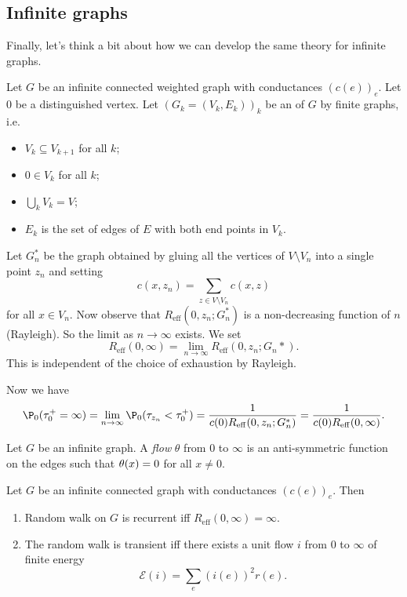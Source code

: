 \documentclass[a4paper]{article}
\let\div\relax
\DeclareMathOperator\div{div}
\begin{document}
\subsection{Infinite graphs}
Finally, let's think a bit about how we can develop the same theory for infinite graphs.

Let $G$ be an infinite connected weighted graph with conductances $(c(e))_e$. Let $0$ be a distinguished vertex. Let $(G_k = (V_k, E_k))_k$ be an  of $G$ by finite graphs, i.e.
\begin{itemize}
  \item $V_k \subseteq V_{k + 1}$ for all $k$;
  \item $0 \in V_k$ for all $k$;
  \item $\bigcup_k V_k = V$;
  \item $E_k$ is the set of edges of $E$ with both end points in $V_k$.
\end{itemize}

Let $G_n^*$ be the graph obtained by gluing all the vertices of $V \setminus V_n$ into a single point $z_n$ and setting
\[
  c(x, z_n) = \sum_{z \in V \setminus V_n} c(x, z)
\]
for all $x \in V_n$. Now observe that $R_{\mathrm{eff}}(0, z_n; G_n^*)$ is a non-decreasing function of $n$ (Rayleigh). So the limit as $n \to \infty$ exists. We set 
\[
  R_{\mathrm{eff}}(0, \infty) = \lim_{n \to \infty} R_{\mathrm{eff}}(0, z_n; G_n*).
\]
This is independent of the choice of exhaustion by Rayleigh. %

Now we have
\[
  \P_0(\tau_0^+ = \infty) = \lim_{n \to \infty} \P_0(\tau_{z_n} < \tau_0^+) = \frac{1}{c(0) R_{\mathrm{eff}}(0, z_n; G_n^*)} = \frac{1}{c(0) R_{\mathrm{eff}}(0, \infty)}.
\]
\begin{defi}[Flow]
  Let $G$ be an infinite graph. A \emph{flow} $\theta$ from $0$ to $\infty$ is an anti-symmetric function on the edges such that $\div \theta(x) = 0$ for all $x \not= 0$.
\end{defi}

\begin{thm}
  Let $G$ be an infinite connected graph with conductances $(c(e))_e$. Then
  \begin{enumerate}
    \item Random walk on $G$ is recurrent iff $R_{\mathrm{eff}}(0, \infty) = \infty$.
    \item The random walk is transient iff there exists a unit flow $i$ from $0$ to $\infty$ of finite energy
      \[
        \mathcal{E}(i) = \sum_e (i(e))^2 r(e).
      \]
  \end{enumerate}
\end{thm}
\end{document}
